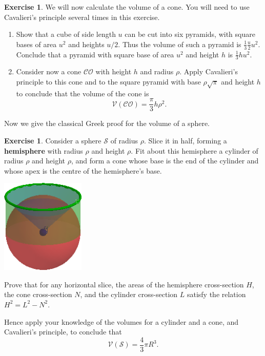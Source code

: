 \documentclass[a4paper]{report}
\theoremstyle{definition}
\newtheorem{exercise}[thm]{Exercise}
\newcommand{\df}[1]{\textbf{#1}\index{#1}}
\begin{document}
  \begin{exercise}
    We will now calculate the volume of a cone. You will need to use Cavalieri's principle several times
    in this exercise.
    \begin{enumerate}
      \item Show that a cube of side length $ u $ can be cut into six pyramids, with square bases of area $ u^2 $
            and heights $ u/2 $. Thus the volume of such a pyramid is $ \frac{1}{3} \frac{u}{2} u^2 $. Conclude that a pyramid
            with square base of area $ u^2 $ and height $ h $ is $ \frac{1}{3} h u^2 $.
      \item Consider now a cone $ \mathcal{CO} $ with height $ h $ and radius $ \rho $. Apply Cavalieri's principle to this cone
            and to the square pyramid with base $ \rho \sqrt{\pi} $ and height $ h $ to conclude that the volume
            of the cone is
            \begin{equation}
               \mathcal{V}(\mathcal{CO}) = \frac{\pi}{3}h \rho^2.
            \end{equation}
    \end{enumerate}
  \end{exercise}

  Now we give the classical Greek proof for the volume of a sphere.
  \begin{exercise}
    Consider a sphere $ \mathcal{S} $ of radius $ \rho $. Slice it in half, forming a \df{hemisphere} with radius $ \rho $ and height $ \rho $.
    Fit about this hemisphere a cylinder of radius $ \rho $ and height $ \rho $, and form a cone whose base is the end of the cylinder
    and whose apex is the centre of the hemisphere's base.

    \begin{center}
      \includegraphics[width=0.3\textwidth]{sphere1}
    \end{center}

    Prove that for any horizontal slice, the areas of the hemisphere cross-section $ H $,
    the cone cross-section $ N $, and the cylinder cross-section $ L $ satisfy the
    relation $ H^2 = L^2 - N^2 $.

    Hence apply your knowledge of the volumes for a cylinder and a cone, and Cavalieri's
    principle, to conclude that
    \begin{equation}
      \mathcal{V}(\mathcal{S}) = \frac{4}{3} \pi R^3.
    \end{equation}
  \end{exercise}
\end{document}
